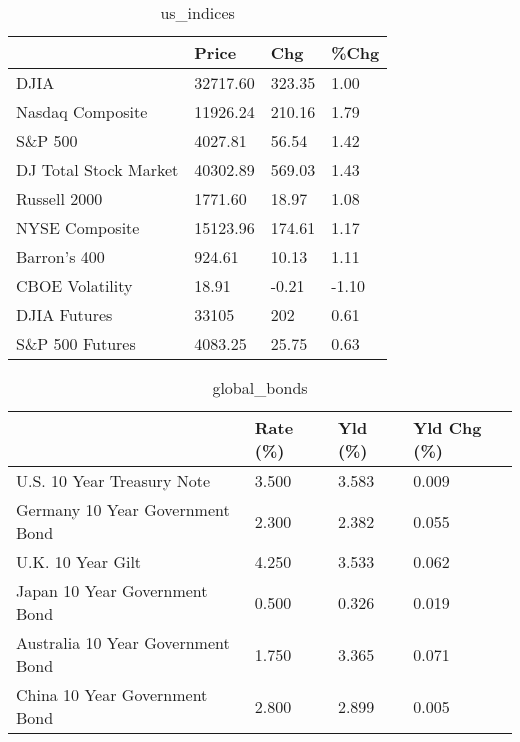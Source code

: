 \documentclass{article}%
\begin{document}
%


\begin{table}[htbp]%
\caption{us\_indices}%
\centering%
\begin{adjustbox}{width=1\textwidth}%
\begin{tabular}{llll}
\toprule
                      &    Price &    Chg &  \%Chg \\
\midrule
                 DJIA & 32717.60 & 323.35 &  1.00 \\
     Nasdaq Composite & 11926.24 & 210.16 &  1.79 \\
              S\&P 500 &  4027.81 &  56.54 &  1.42 \\
DJ Total Stock Market & 40302.89 & 569.03 &  1.43 \\
         Russell 2000 &  1771.60 &  18.97 &  1.08 \\
       NYSE Composite & 15123.96 & 174.61 &  1.17 \\
         Barron's 400 &   924.61 &  10.13 &  1.11 \\
      CBOE Volatility &    18.91 &  -0.21 & -1.10 \\
         DJIA Futures &    33105 &    202 &  0.61 \\
      S\&P 500 Futures &  4083.25 &  25.75 &  0.63 \\
\bottomrule
\end{tabular}
%
\end{adjustbox}%
\end{table}

%


\begin{table}[htbp]%
\caption{global\_bonds}%
\centering%
\begin{adjustbox}{width=1\textwidth}%
\begin{tabular}{llll}
\toprule
                                  & Rate (\%) & Yld (\%) & Yld Chg (\%) \\
\midrule
       U.S. 10 Year Treasury Note &    3.500 &   3.583 &       0.009 \\
  Germany 10 Year Government Bond &    2.300 &   2.382 &       0.055 \\
                U.K. 10 Year Gilt &    4.250 &   3.533 &       0.062 \\
    Japan 10 Year Government Bond &    0.500 &   0.326 &       0.019 \\
Australia 10 Year Government Bond &    1.750 &   3.365 &       0.071 \\
    China 10 Year Government Bond &    2.800 &   2.899 &       0.005 \\
\bottomrule
\end{tabular}
%
\end{adjustbox}%
\end{table}
\end{document}
